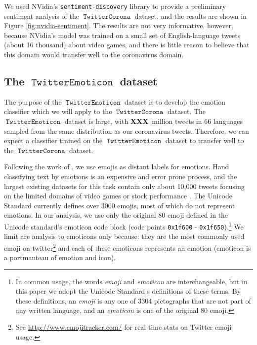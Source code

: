 \documentclass[11pt]{article}
\newcommand{\defn}[1]{\emph{{#1}}}
\newcommand{\XXX}{\textbf{XXX}~}
\DeclareMathOperator{\emoticon}{\texttt{TwitterEmoticon}}
\DeclareMathOperator{\corona}{\texttt{TwitterCorona}}
\begin{document}
We used NVidia's \texttt{sentiment-discovery} library to provide a preliminary sentiment analysis of the $\corona$ dataset,
and the results are shown in Figure \ref{fig:nvidia-sentiment}.
The results are not very informative, however, because NVidia's model was trained on a small set of English-language tweets (about 16 thousand) about video games,
and there is little reason to believe that this domain would transfer well to the coronavirus domain.


\subsection {The $\emoticon$ dataset}

The purpose of the $\emoticon$ dataset is to develop the emotion classifier which we will apply to the $\corona$ dataset.
The $\emoticon$ dataset is large, with \XXX million tweets in 66 languages sampled from the same distribution as our coronavirus tweets.
Therefore, we can expect a classifier trained on the $\emoticon$ dataset to transfer well to the $\corona$ dataset.

Following the work of \citet{fixme1,fixme2,fixme3}, we use emojis as distant labels for emotions.
Hand classifying text by emotions is an expensive and error prone process,
and the largest existing datasets for this task contain only about 10,000 tweets focusing on the limited domains of video games \citep{fixme} or stock performance \citep{fixme}.
The Unicode Standard \citep{fixme} currently defines over 3000 emojis,
most of which do not represent emotions.
In our analysis, we use only the original 80 emoji defined in the Unicode standard's emoticon code block (code points \texttt{0x1f600} - \texttt{0x1f650}).\footnote{
    In common usage, the words \defn{emoji} and \defn{emoticon} are interchangeable,
    but in this paper we adopt the Unicode Standard's definitions of these terms.
    By these definitions, an \defn{emoji} is any one of 3304 pictographs that are not part of any written language,
    and an \defn{emoticon} is one of the original 80 emoji.
}
We limit are analysis to emoticons only because:
they are the most commonly used emoji on twitter\footnote{
    See \url{http://www.emojitracker.com/} for real-time stats on Twitter emoji usage.
}
and each of these emoticons represents an emotion (emoticon is a portmanteau of emotion and icon).
\end{document}
